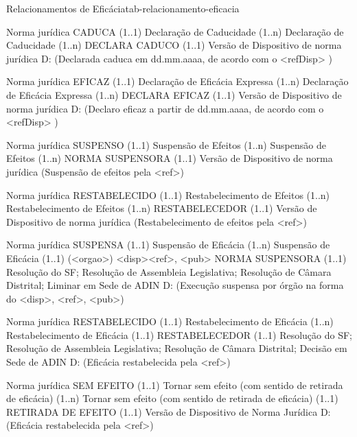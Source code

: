 \begin{tabelarelacionamento}{Relacionamentos
de Eficácia}{tab-relacionamento-eficacia}

  \relacionamento
  	{Norma jurídica}
 	{CADUCA (1..1)}
 	{Declaração de Caducidade}
 	{(1..n) Declaração de Caducidade (1..n)}
 	{DECLARA CADUCO  (1..1)}
 	{Versão de Dispositivo de norma jurídica}
 	{D: (Declarada caduca em dd.mm.aaaa, de acordo com o <refDisp> )}

  \relacionamento
  	{Norma jurídica}
 	{EFICAZ (1..1)}
 	{Declaração de Eficácia Expressa}
 	{(1..n) Declaração de Eficácia Expressa (1..n)}
 	{DECLARA EFICAZ  (1..1)}
 	{Versão de Dispositivo de norma jurídica}
 	{D: (Declaro eficaz a partir de dd.mm.aaaa, de acordo com o <refDisp> )}
 	
  \relacionamento
  	{Norma jurídica}
 	{SUSPENSO (1..1)}
 	{Suspensão de Efeitos}
 	{(1..n) Suspensão de Efeitos (1..n)}
 	{NORMA SUSPENSORA (1..1)}
 	{Versão de Dispositivo de norma jurídica}
 	{(Suspensão de efeitos pela <ref>)}
 	
  \relacionamento
  	{Norma jurídica}
 	{RESTABELECIDO (1..1)}
 	{Restabelecimento de Efeitos}
 	{(1..n) Restabelecimento de Efeitos (1..n)}
 	{RESTABELECEDOR (1..1)}
 	{Versão de Dispositivo de norma jurídica}
 	{(Restabelecimento de efeitos pela <ref>)}
 	
  \relacionamento
  	{Norma jurídica}
 	{SUSPENSA (1..1)}
 	{Suspensão de Eficácia}
 	{(1..n) Suspensão de Eficácia (1..1)
	 \mypar
	 (<orgao>) <disp><ref>, <pub>}
 	{NORMA SUSPENSORA (1..1)}
 	{Resolução do SF; Resolução de Assembleia Legislativa; Resolução de Câmara Distrital; Liminar em Sede de ADIN}
 	{D: (Execução suspensa por  órgão na forma do <disp>, <ref>, <pub>)}
 	
  \relacionamento
  	{Norma jurídica}
 	{RESTABELECIDO (1..1)}
 	{Restabelecimento de Eficácia}
 	{(1..n) Restabelecimento de Eficácia (1..1)}
 	{RESTABELECEDOR (1..1)}
 	{Resolução do SF; Resolução de Assembleia Legislativa; Resolução de Câmara Distrital; Decisão em Sede de ADIN}
 	{D: (Eficácia restabelecida pela  <ref>)}
 	
  \relacionamento
  	{Norma jurídica}
 	{SEM EFEITO (1..1)}
 	{Tornar sem efeito (com sentido de retirada de eficácia)}
 	{(1..n) Tornar sem efeito (com sentido de retirada de eficácia) (1..1)}
 	{RETIRADA DE EFEITO (1..1)}
 	{Versão de Dispositivo de Norma Jurídica}
 	{D: (Eficácia restabelecida pela  <ref>)}
 	
\end{tabelarelacionamento}

